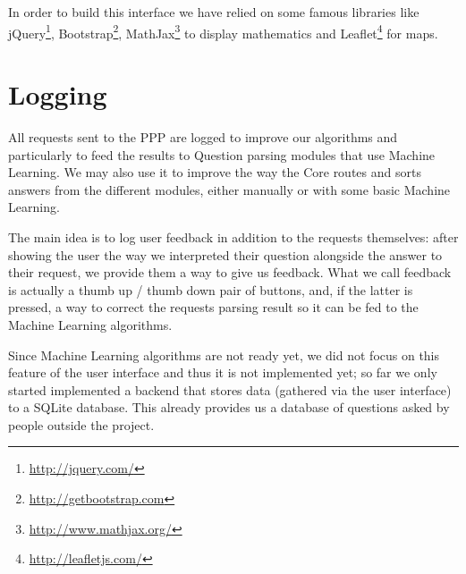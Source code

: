 In order to build this interface we have relied on some famous libraries 
like jQuery\footnote{\url{http://jquery.com/}}, Bootstrap\footnote{\url{http://getbootstrap.com}}, MathJax\footnote{\url{http://www.mathjax.org/}} to display mathematics and Leaflet\footnote{\url{http://leafletjs.com/}} for maps.

\section{Logging}

All requests sent to the PPP are logged to improve our algorithms
and particularly to feed the results to Question parsing
modules that use Machine Learning.
We may also use it to improve the way the Core routes and sorts answers
from the different modules, either manually or with some basic
Machine Learning.

The main idea is to log user feedback in addition to the requests
themselves: after showing the user the way we interpreted their
question alongside the answer to their request, we provide them a
way to give us feedback.
What we call feedback is actually a thumb up / thumb down pair of
buttons, and, if the latter is pressed, a way to correct the requests
parsing result so it can be fed to the Machine Learning algorithms.

Since Machine Learning algorithms are not ready yet, we did not focus
on this feature of the user interface and thus it is not implemented yet;
so far we only started implemented a backend that stores data
(gathered via the user interface) to a SQLite database.
This already provides us a database of questions asked by people
outside the project.
